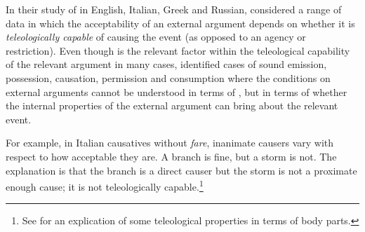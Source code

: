 \begin{exe}
\begin{xlist}
\begin{exe}
\begin{xlist}
\begin{exe}
\begin{xlist}
\begin{exe}
\begin{exe}
\begin{xlist}
\begin{exe}
\begin{xlist}
\begin{exe}
\begin{xlist}
\begin{exe}
\begin{xlist}
\begin{exe}
\begin{xlist}
\begin{exe}
\begin{xlist}
\begin{exe}
\begin{xlist}
\begin{exe}
\begin{xlist}
\begin{exe}
\begin{xlist}
\begin{exe}
\begin{xlist}
\begin{exe}
\begin{xlist}
\begin{exe}
\begin{xlist}
\begin{exe}
\begin{exe}
\begin{xlist}
\begin{exe}
\begin{xlist}
\begin{exe}
\begin{xlist}
\begin{exe}
\begin{xlist}
{\begin{exe}
\begin{xlist}
\begin{exe}
\begin{xlist}
\begin{exe}
\begin{xlist}
\begin{exe}
\begin{xlist}
\begin{xlist}
\begin{xlist}
\begin{exe}
\begin{xlist}
\begin{xlist}
\begin{xlist}
\begin{exe}
\begin{exe}
\begin{xlist}
\begin{exe}
\begin{xlist}
\begin{exe}
\begin{xlist}
\begin{exe}
\begin{xlist}
\begin{exe}
\begin{xlist}
In their study of  in English, Italian, Greek and Russian, \cite{folliharley08} considered a range of data in which the acceptability of an external argument depends on whether it is \emph{teleologically capable} of causing the event (as opposed to an agency or  restriction). Even though  is the relevant factor within the teleological capability of the relevant argument in many cases, \cite{folliharley08} identified cases of sound emission, possession, causation, permission and consumption where the  conditions on external arguments cannot be understood in terms of , but in terms of whether the internal properties of the external argument can bring about the relevant event.

For example, in Italian causatives without \emph{fare}, inanimate causers vary with respect to how acceptable they are. A branch is fine, but a storm is not. The explanation is that the branch is a direct causer but the storm is not a proximate enough cause; it is not teleologically capable.\footnote{See \cite{irwin19tlr} for an explication of some teleological properties in terms of body parts.}
 \begin{exe}
 \ex  {}
 \begin{xlist} 
		

\end{xlist}
\end{exe}
\end{xlist}
\end{exe}
\end{xlist}
\end{exe}
\end{xlist}
\end{exe}
\end{xlist}
\end{exe}
\end{xlist}
\end{exe}
\end{exe}
\end{xlist}
\end{xlist}
\end{xlist}
\end{exe}
\end{xlist}
\end{xlist}
\end{xlist}
\end{exe}
\end{xlist}
\end{exe}
\end{xlist}
\end{exe}
\end{xlist}
\end{exe}}
\end{xlist}
\end{exe}
\end{xlist}
\end{exe}
\end{xlist}
\end{exe}
\end{xlist}
\end{exe}
\end{exe}
\end{xlist}
\end{exe}
\end{xlist}
\end{exe}
\end{xlist}
\end{exe}
\end{xlist}
\end{exe}
\end{xlist}
\end{exe}
\end{xlist}
\end{exe}
\end{xlist}
\end{exe}
\end{xlist}
\end{exe}
\end{xlist}
\end{exe}
\end{xlist}
\end{exe}
\end{xlist}
\end{exe}
\end{xlist}
\end{exe}
\end{exe}
\end{xlist}
\end{exe}
\end{xlist}
\end{exe}
\end{xlist}
\end{exe}
